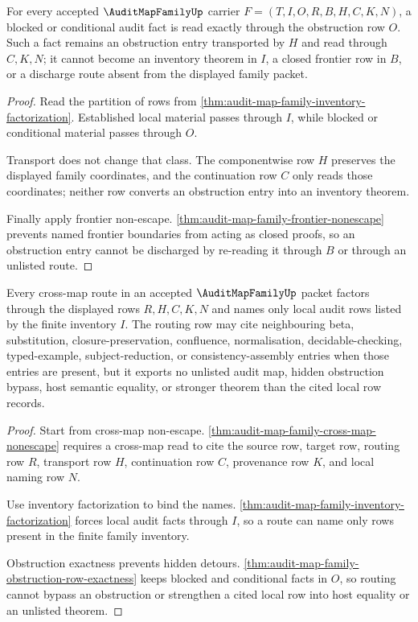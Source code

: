 \begin{theorem}
\label{thm:audit-map-family-obstruction-row-exactness}
For every accepted $\AuditMapFamilyUp$ carrier $F=(T,I,O,R,B,H,C,K,N)$, a blocked or conditional audit fact is read exactly through the obstruction row $O$. Such a fact remains an obstruction entry transported by $H$ and read through $C,K,N$; it cannot become an inventory theorem in $I$, a closed frontier row in $B$, or a discharge route absent from the displayed family packet.
\end{theorem}
\begin{proof}
Read the partition of rows from \autoref{thm:audit-map-family-inventory-factorization}. Established local material passes through $I$, while blocked or conditional material passes through $O$.

Transport does not change that class. The componentwise row $H$ preserves the displayed family coordinates, and the continuation row $C$ only reads those coordinates; neither row converts an obstruction entry into an inventory theorem.

Finally apply frontier non-escape. \autoref{thm:audit-map-family-frontier-nonescape} prevents named frontier boundaries from acting as closed proofs, so an obstruction entry cannot be discharged by re-reading it through $B$ or through an unlisted route.
\end{proof}

\begin{theorem}
\label{thm:audit-map-family-routing-row-exhaustion}
Every cross-map route in an accepted $\AuditMapFamilyUp$ packet factors through the displayed rows $R,H,C,K,N$ and names only local audit rows listed by the finite inventory $I$. The routing row may cite neighbouring beta, substitution, closure-preservation, confluence, normalisation, decidable-checking, typed-example, subject-reduction, or consistency-assembly entries when those entries are present, but it exports no unlisted audit map, hidden obstruction bypass, host semantic equality, or stronger theorem than the cited local row records.
\end{theorem}
\begin{proof}
Start from cross-map non-escape. \autoref{thm:audit-map-family-cross-map-nonescape} requires a cross-map read to cite the source row, target row, routing row $R$, transport row $H$, continuation row $C$, provenance row $K$, and local naming row $N$.

Use inventory factorization to bind the names. \autoref{thm:audit-map-family-inventory-factorization} forces local audit facts through $I$, so a route can name only rows present in the finite family inventory.

Obstruction exactness prevents hidden detours. \autoref{thm:audit-map-family-obstruction-row-exactness} keeps blocked and conditional facts in $O$, so routing cannot bypass an obstruction or strengthen a cited local row into host equality or an unlisted theorem.
\end{proof}

